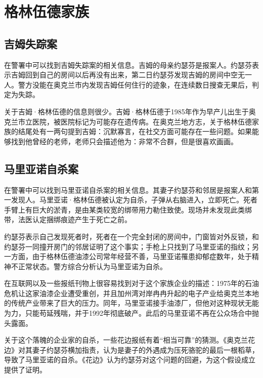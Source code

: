 \section{格林伍德家族}
\subsection{吉姆失踪案}
在警署中可以找到吉姆失踪案的相关信息。吉姆的母亲约瑟芬是报案人。约瑟芬表示吉姆回到自己的房间以后再没有出来，第二日约瑟芬发现吉姆的房间中空无一人。警方没能在奥克兰市内发现吉姆任何住行的迹象，在连续数日搜查无果后，判定为失踪。

关于吉姆·格林伍德的信息则很少。吉姆·格林伍德于1985年作为早产儿出生于奥克兰市立医院，被医院标记为可能存在遗传病。在奥克兰地方志，关于格林伍德家族的结尾处有一两句提到吉姆：沉默寡言，在社交方面可能存在一些问题。如果能够找到他曾经的老师，老师只会描述他为：非常不合群，但是很喜欢画画。 

\subsection{马里亚诺自杀案}
在警署中可以找到马里亚诺自杀案的相关信息。其妻子约瑟芬和邻居是报案人和第一发现人。马里亚诺·格林伍德被认定为自杀，子弹从右脑进入，立即死亡。死者手臂上有巨大的淤青，是由某类较宽的绑带用力勒住致使。现场并未发现此类绑带，法医认定捆绑痕迹产生于死亡之前。

约瑟芬表示自己发现死者时，死者在一个完全封闭的房间中，门窗皆对外反锁，和约瑟芬一同撞开房门的邻居证明了这个事实；手枪上只找到了马里亚诺的指纹；另一方面，由于格林伍德油漆公司常年经营不善，马里亚诺罹患抑郁症数年，处于精神不正常状态。警方综合分析认为马里亚诺为自杀。

在互联网以及一些报纸刊物上很容易找到对于这个家族企业的描述：1975年的石油危机让这家油漆企业遭受重创，并且加州湾对岸冉冉升起的电子产业给奥克兰本地的传统产业带来了巨大的压力。同年，马里亚诺接手油漆厂，但他对这种现状无能为力，只能苟延残喘，并于1992年彻底破产。此后的马里亚诺不再在公众场合中抛头露面。

关于这个落魄的企业家的自杀，一些花边报纸有着“相当可靠”的猜测。《奥克兰花边》对其妻子约瑟芬横加指责，认为是妻子的外遇成为压死骆驼的最后一根稻草，导致了马里亚诺的自杀。《花边》认为约瑟芬对这个问题的回避，为这个假设成立提供了证明。